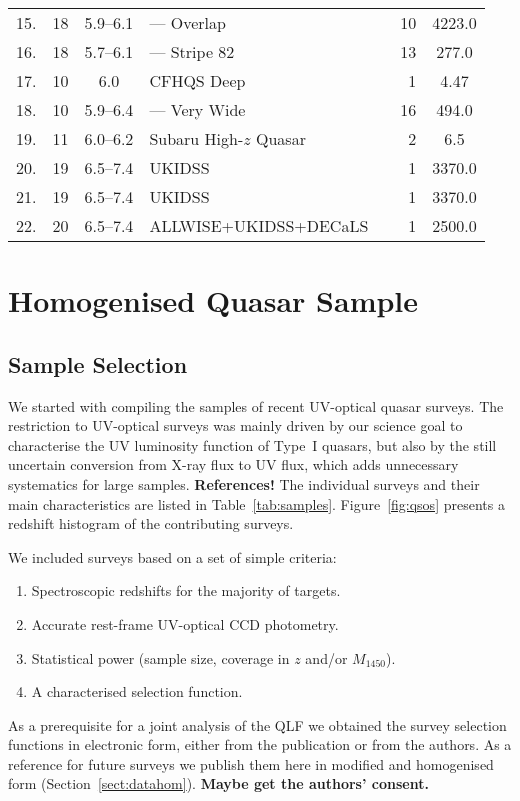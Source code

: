 \documentclass[a4paper,fleqn,usenatbib]{mnras}
\begin{document}
\begin{table*}
\begin{tabular}{crcllrS}
    15. & 18 & 5.9--6.1 & --- Overlap & \citet{2016ApJ...833..222J} & 10 & 4223.0 \\
    16. & 18 & 5.7--6.1 & --- Stripe 82 & \citet{2016ApJ...833..222J} & 13 & 277.0 \\
    17. & 10 & 6.0 & CFHQS Deep & \citet{2010AJ....139..906W} & 1 & 4.47 \\
    18. & 10 & 5.9--6.4 & --- Very Wide & \citet{2010AJ....139..906W} & 16 & 494.0 \\
    19. & 11 & 6.0--6.2 & Subaru High-$z$ Quasar & \citet{2015ApJ...798...28K} & 2 & 6.5 \\
    20. & 19 & 6.5--7.4 & UKIDSS & \citet{2011Natur.474..616M} & 1 & 3370.0 \\
    21. & 19 & 6.5--7.4 & UKIDSS & \citet{2007MNRAS.376L..76V} & 1 & 3370.0 \\
    22. & 20 & 6.5--7.4 & ALLWISE+UKIDSS+DECaLS & \citet{2018Natur.553..473B} & 1 & 2500.0 \\
    \hline
  \end{tabular}
\end{table*}

\section{Homogenised Quasar Sample}
\label{sec:sample}

\subsection{Sample Selection}

We started with compiling the samples of recent UV-optical quasar
surveys. The restriction to UV-optical surveys was mainly driven by
our science goal to characterise the UV luminosity function of Type~I
quasars, but also by the still uncertain conversion from X-ray flux to
UV flux, which adds unnecessary systematics for large
samples. \textbf{References!} The individual surveys and their main
characteristics are listed in
Table~\ref{tab:samples}. Figure~\ref{fig:qsos} presents a redshift
histogram of the contributing surveys.

We included surveys based on a set of simple criteria:
\begin{enumerate}
\item Spectroscopic redshifts for the majority of targets.
\item Accurate rest-frame UV-optical CCD photometry.
\item Statistical power (sample size, coverage in $z$ and/or $M_{1450}$).
\item A characterised selection function.
\end{enumerate}
As a prerequisite for a joint analysis of the QLF we obtained the
survey selection functions in electronic form, either from the
publication or from the authors. As a reference for future surveys we
publish them here in modified and homogenised form
(Section~\ref{sect:datahom}). \textbf{Maybe get the authors' consent.}
\end{document}
